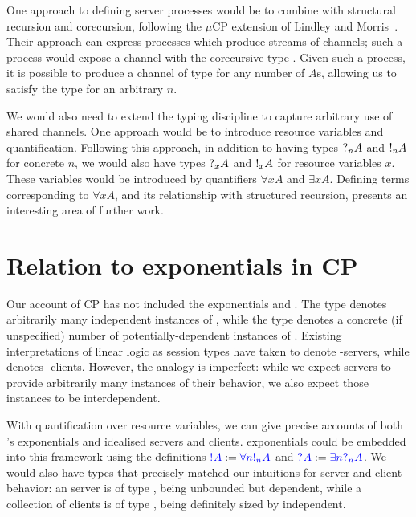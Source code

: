 One approach to defining server processes would be to combine \nodcap with
structural recursion and corecursion, following the $\mu\text{CP}$ extension of Lindley
and Morris~\cite{lindley2016}.  Their approach can express processes which
produce streams of  channels; such a process would expose a channel with the
corecursive type .  Given such a process, it is
possible to produce a channel of type  for any
number of $A$s, allowing us to satisfy the type  for an arbitrary
$n$.

We would also need to extend the typing discipline to capture arbitrary use of
shared channels.  One approach would be to introduce resource variables and
quantification.  Following this approach, in addition to having types $\give[n]
A$ and $\take[n] A$ for concrete $n$, we would also have types $\give[x] A$ and
$\take[x] A$ for resource variables $x$.  These variables would be introduced by
quantifiers $\forall x A$ and $\exists x A$.  Defining terms
corresponding to $\forall x A$, and its relationship with structured recursion,
presents an interesting area of further work.


\section{Relation to exponentials in CP}
Our account of CP has not included the exponentials  and .
The type  denotes arbitrarily many independent instances of , while
the type  denotes a concrete (if unspecified) number of
potentially-dependent instances of .  Existing interpretations of linear
logic as session types have taken  to denote -servers, while
 denotes -clients.  However, the analogy is imperfect: while we
expect servers to provide arbitrarily many instances of their behavior, we also
expect those instances to be interdependent.

With quantification over resource variables, we can give precise accounts
of both \cp's exponentials and idealised servers and clients.
\cp exponentials could be embedded into this framework using the definitions
$\ty{\take{A}} := \ty{\forall{n}\take[n]{A}}$ and $\ty{\give{A}} :=
\ty{\exists{n}{\give[n]{A}}}$.
We would also have types that precisely matched our intuitions for server and
client behavior: an  server is of type , being
unbounded but dependent, while a collection of  clients is of type
, being definitely sized by independent.

